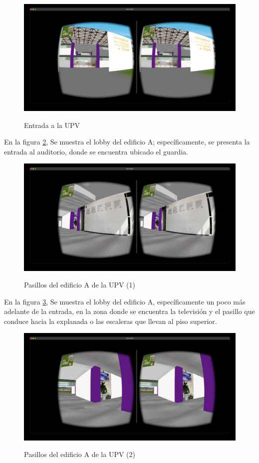 \documentclass[conference]{IEEEtran}
\begin{document}
\begin{figure}[h]
    \centering
        {\includegraphics[width=0.8\columnwidth]{Capturas/img1.jpeg}}
        \caption{Entrada a la UPV}
        \label{fig:e1}
\end{figure}

En la figura \ref{fig:e2}, Se muestra el lobby del edificio A; específicamente, se presenta la entrada al auditorio, donde se encuentra ubicado el guardia.

\begin{figure}[h]
    \centering
        {\includegraphics[width=0.8\columnwidth]{Capturas/img2.jpeg}}
        \caption{Pasillos del edificio A de la UPV (1)}
        \label{fig:e2}
\end{figure}

En la figura \ref{fig:e3}, Se muestra el lobby del edificio A, específicamente un poco más adelante de la entrada, en la zona donde se encuentra la televisión y el pasillo que conduce hacia la explanada o las escaleras que llevan al piso superior.
\begin{figure}[h]
    \centering
        {\includegraphics[width=0.8\columnwidth]{Capturas/img3.jpeg}}
        \caption{Pasillos del edificio A de la UPV (2)}
        \label{fig:e3}
\end{figure}
\end{document}
